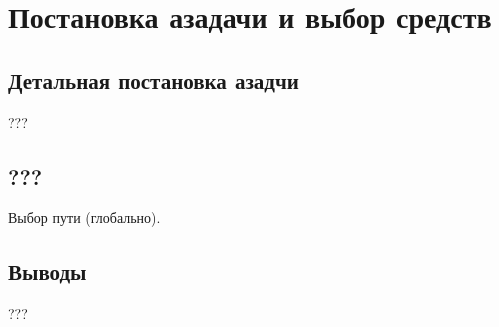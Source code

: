 \chapter{Постановка азадачи и выбор средств}

\section{Детальная постановка азадчи}

???

\section{???}

Выбор пути (глобально).

\section{Выводы}

???
